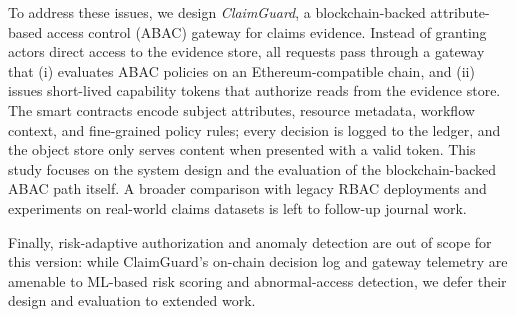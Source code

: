 \documentclass[conference]{IEEEtran}
\begin{document}


To address these issues, we design \emph{ClaimGuard}, a blockchain-backed attribute-based access control (ABAC) gateway for claims evidence. Instead of granting actors direct access to the evidence store, all requests pass through a gateway that (i) evaluates ABAC policies on an Ethereum-compatible chain, and (ii) issues short-lived capability tokens that authorize reads from the evidence store. The smart contracts encode subject attributes, resource metadata, workflow context, and fine-grained policy rules; every decision is logged to the ledger, and the object store only serves content when presented with a valid token. This study focuses on the system design and the evaluation of the blockchain-backed ABAC path itself. A broader comparison with legacy RBAC deployments and experiments on real-world claims datasets is left to follow-up journal work.

Finally, risk-adaptive authorization and anomaly detection are out of scope for this version: while ClaimGuard's on-chain decision log and gateway telemetry are amenable to ML-based risk scoring and abnormal-access detection, we defer their design and evaluation to extended work.
\end{document}
